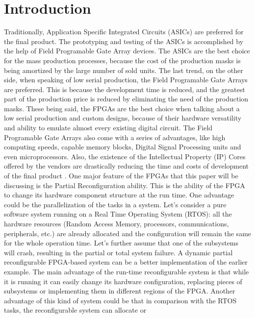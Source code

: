 \documentclass[twoside]{romjist}
\begin{document}
	\section{Introduction}
	\hspace{0.5cm}
	Traditionally, Application Specific Integrated Circuits (ASICs) are preferred for the final
	product. The prototyping and testing of the ASICs is accomplished by the help of Field
	Programable Gate Array devices. The ASICs are the best choice for the mass production
	processes, because the cost of the production masks is being amortized by the large number of
	sold units. The last trend, on the other side, when speaking of low serial production, the Field
	Programable Gate Arrays are preferred. This is because the development time is reduced, and
	the greatest part of the production price is reduced by eliminating the need of the production
	masks. These being said, the FPGAs are the best choice when talking about a low serial
	production and custom designs, because of their hardware versatility and ability to emulate
	almost every existing digital circuit. The Field Programable Gate Arrays also come with a
	series of advantages, like high computing speeds, capable memory blocks, Digital Signal
	Processing units and even microprocessors. Also, the existence of the Intellectual Property (IP)
	Cores offered by the vendors are drastically reducing the time and costs of development of the
	final product \cite{1} \cite{9}.
	One major feature of the FPGAs that this paper will be discussing is the Partial Reconfiguration
	ability. This is the ability of the FPGA to change its hardware component structure at the run
	time. One advantage could be the parallelization of the tasks in a system. Let’s consider a pure
	software system running on a Real Time Operating System (RTOS): all the hardware resources
	(Random Access Memory, processors, communications, peripherals, etc.) are already allocated
	and the configuration will remain the same for the whole operation time. Let’s further assume
	that one of the subsystems will crash, resulting in the partial or total system failure. A dynamic
	partial reconfigurable FPGA-based system can be a better implementation of the earlier
	example. The main advantage of the run-time reconfigurable system is that while it is running
	it can easily change its hardware configuration, replacing pieces of subsystems or
	implementing them in different regions of the FPGA. Another advantage of this kind of system
	could be that in comparison with the RTOS tasks, the reconfigurable system can allocate or
\end{document}

